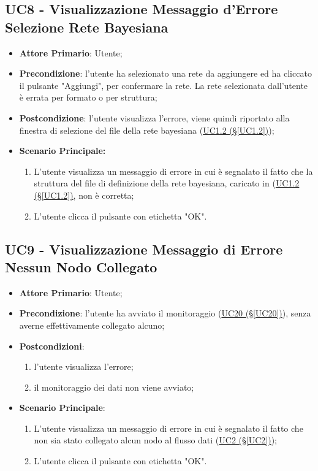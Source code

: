 \pagebreak

\subsection{UC8 - Visualizzazione Messaggio d'Errore Selezione Rete Bayesiana}\label{UC8}
\begin{itemize}
\item \textbf{Attore Primario}: Utente;
\item \textbf{Precondizione}: l'utente ha selezionato una rete da aggiungere ed ha cliccato il pulsante "Aggiungi", per confermare la rete. La rete selezionata dall'utente è errata per formato o per struttura;
\item \textbf{Postcondizione}: l'utente visualizza l'errore, viene quindi riportato alla finestra di selezione del file della rete bayesiana (\hyperref[UC1.2]{UC1.2 (§\ref*{UC1.2})});
\item \textbf{Scenario Principale:} 
	\begin{enumerate}
	\item L'utente visualizza un messaggio di errore in cui è segnalato il fatto che la struttura del file di definizione della rete bayesiana, caricato in (\hyperref[UC1.2]{UC1.2 (§\ref*{UC1.2})}, non è corretta;
	\item L'utente clicca il pulsante con etichetta "OK".
	\end{enumerate}
\end{itemize}

\pagebreak

\subsection{UC9 - Visualizzazione Messaggio di Errore Nessun Nodo Collegato}\label{UC9}
\begin{itemize}
\item \textbf{Attore Primario}: Utente;
\item \textbf{Precondizione}: l'utente ha avviato il monitoraggio (\hyperref[UC20]{UC20 (§\ref*{UC20})}), senza averne effettivamente collegato alcuno;
\item \textbf{Postcondizioni}: 
	\begin{enumerate}
	\item l'utente visualizza l'errore;
	\item il monitoraggio dei dati non viene avviato;
	\end{enumerate}
\item \textbf{Scenario Principale}: 
	\begin{enumerate}
	\item L'utente visualizza un messaggio di errore in cui è segnalato il fatto che non sia stato collegato alcun 				nodo al flusso dati (\hyperref[UC2]{UC2 (§\ref*{UC2})});
	\item L'utente clicca il pulsante con etichetta "OK".
	\end{enumerate}
\end{itemize}

